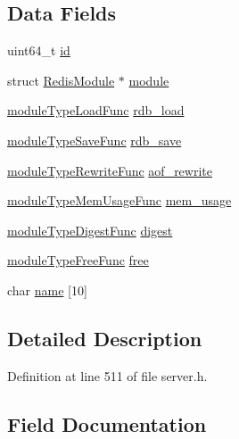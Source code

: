 \subsection*{Data Fields}
\begin{DoxyCompactItemize}
\item 
uint64\+\_\+t \hyperlink{struct_redis_module_type_a7e290573ef1be67b92a2c745e3b00d1d}{id}
\item 
struct \hyperlink{struct_redis_module}{Redis\+Module} $\ast$ \hyperlink{struct_redis_module_type_a0b5d3833feb2320585734795fb7f62b6}{module}
\item 
\hyperlink{server_8h_a828eedada3f580a3c87038a86451482a}{module\+Type\+Load\+Func} \hyperlink{struct_redis_module_type_a40f9f41115e6664b101f4b358deebd3b}{rdb\+\_\+load}
\item 
\hyperlink{server_8h_a135930c4755891558676ed788fae701b}{module\+Type\+Save\+Func} \hyperlink{struct_redis_module_type_a0cd3611f995b73531f3cba3716f69839}{rdb\+\_\+save}
\item 
\hyperlink{server_8h_a40830f84874e380a79a349e91552d187}{module\+Type\+Rewrite\+Func} \hyperlink{struct_redis_module_type_af8f8737aabdb7c45ccbf85e7d4351541}{aof\+\_\+rewrite}
\item 
\hyperlink{server_8h_a686795dcf15453eb345d43007c933f9b}{module\+Type\+Mem\+Usage\+Func} \hyperlink{struct_redis_module_type_ae3702833db2444b2ec958b5116dc00d3}{mem\+\_\+usage}
\item 
\hyperlink{server_8h_abd6a3739d32c76c9d560324215668d1b}{module\+Type\+Digest\+Func} \hyperlink{struct_redis_module_type_ad99df9c318d570861b92496bbf158efa}{digest}
\item 
\hyperlink{server_8h_a3106a404efe2080365b6b39517601a45}{module\+Type\+Free\+Func} \hyperlink{struct_redis_module_type_a966c47580ef5f4abf50e4109df7168ad}{free}
\item 
char \hyperlink{struct_redis_module_type_a38db771080a5bca533de0f0236ff11ec}{name} \mbox{[}10\mbox{]}
\end{DoxyCompactItemize}


\subsection{Detailed Description}


Definition at line 511 of file server.\+h.



\subsection{Field Documentation}
\mbox{\label{struct_redis_module_type_af8f8737aabdb7c45ccbf85e7d4351541}} 
